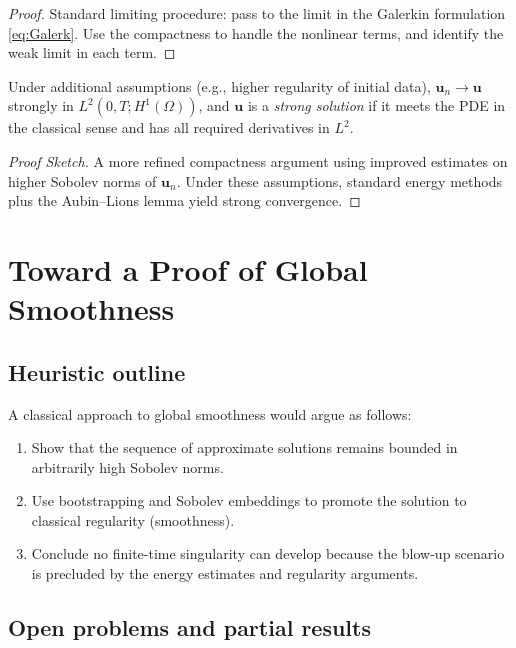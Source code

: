 \documentclass[11pt]{article}
\numberwithin{equation}{section}
\begin{document}
\begin{proof}
Standard limiting procedure: pass to the limit in the Galerkin formulation
\eqref{eq:Galerk}. Use the compactness to handle the nonlinear terms,
and identify the weak limit in each term.
\end{proof}

\begin{theorem}
Under additional assumptions (e.g., higher regularity of initial data),
\(\mathbf{u}_n \to \mathbf{u}\) strongly in \(L^2(0,T;H^1(\Omega))\),
and \(\mathbf{u}\) is a \emph{strong solution} if it meets the PDE in the classical sense
and has all required derivatives in \(L^2\).
\end{theorem}

\begin{proof}[Proof Sketch]
A more refined compactness argument using improved estimates on higher Sobolev
norms of \(\mathbf{u}_n\). Under these assumptions, standard energy methods
plus the Aubin--Lions lemma yield strong convergence.
\end{proof}

\section{Toward a Proof of Global Smoothness}\label{sec:global_smoothness}

\subsection{Heuristic outline}

A classical approach to global smoothness would argue as follows:
\begin{enumerate}[label=(\arabic*)]
\item Show that the sequence of approximate solutions remains bounded
      in arbitrarily high Sobolev norms.
\item Use bootstrapping and Sobolev embeddings to promote the solution
      to classical regularity (smoothness).
\item Conclude no finite-time singularity can develop because the
      blow-up scenario is precluded by the energy estimates and regularity
      arguments.
\end{enumerate}

\subsection{Open problems and partial results}
\end{document}
